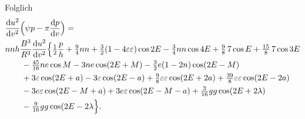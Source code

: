 \noindent Folglich
\[
\begin{aligned}
&\frac{\mathrm du^2}{\mathrm dv^2}
 \Bigl(\psi p-\pi\frac{\mathrm dp}{\mathrm dv}\Bigr)=\\
&nnh\frac{B^3}{R^3}\frac{\mathrm du^2}{\mathrm dv^2}
 \Bigl\{\tfrac12\frac{p}{h}+\tfrac94nn
 +\tfrac32(1-4\varepsilon\varepsilon)\cos2E-\tfrac34nn\cos4E
 +\tfrac98\,7\cos E+\tfrac{15}{8}\,7\cos3E\\
&\qquad-\tfrac{45}{16}ne\cos M-3ne\cos(2E+M)
 -\tfrac32e(1-2n)\cos(2E-M)\\
&\qquad+3\varepsilon\cos(2E+a)-3\varepsilon\cos(2E-a)
 +\tfrac98\varepsilon\varepsilon\cos(2E+2a)
 +\tfrac{39}{8}\varepsilon\varepsilon\cos(2E-2a)\\
&\qquad-3e\varepsilon\cos(2E-M+a)+3e\varepsilon\cos(2E-M-a)
 +\tfrac{3}{16}gg\cos(2E+2\lambda)\\
&\qquad-\tfrac{9}{16}gg\cos(2E-2\lambda\Bigr\}.
\end{aligned}
\]
\clearpage
\endgroup
